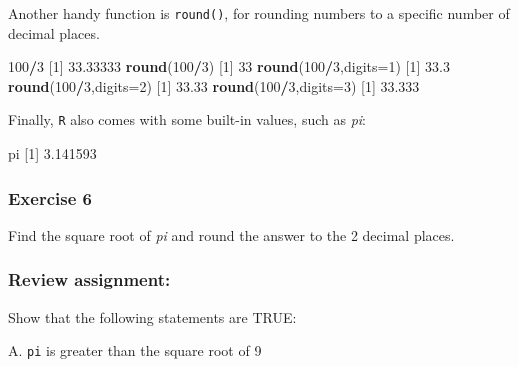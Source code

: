 \documentclass[
]{book}
\newenvironment{Shaded}{\begin{snugshade}}{\end{snugshade}}
\newcommand{\DataTypeTok}[1]{\textcolor[rgb]{0.13,0.29,0.53}{#1}}
\newcommand{\DecValTok}[1]{\textcolor[rgb]{0.00,0.00,0.81}{#1}}
\newcommand{\FloatTok}[1]{\textcolor[rgb]{0.00,0.00,0.81}{#1}}
\newcommand{\KeywordTok}[1]{\textcolor[rgb]{0.13,0.29,0.53}{\textbf{#1}}}
\newcommand{\NormalTok}[1]{#1}
\newcommand{\OperatorTok}[1]{\textcolor[rgb]{0.81,0.36,0.00}{\textbf{#1}}}
\begin{document}
Another handy function is \texttt{round()}, for rounding numbers to a specific number of decimal places.

\begin{Shaded}
\begin{Highlighting}[]
\DecValTok{100}\OperatorTok{/}\DecValTok{3}
\NormalTok{[}\DecValTok{1}\NormalTok{] }\FloatTok{33.33333}
\KeywordTok{round}\NormalTok{(}\DecValTok{100}\OperatorTok{/}\DecValTok{3}\NormalTok{)}
\NormalTok{[}\DecValTok{1}\NormalTok{] }\DecValTok{33}
\KeywordTok{round}\NormalTok{(}\DecValTok{100}\OperatorTok{/}\DecValTok{3}\NormalTok{,}\DataTypeTok{digits=}\DecValTok{1}\NormalTok{)}
\NormalTok{[}\DecValTok{1}\NormalTok{] }\FloatTok{33.3}
\KeywordTok{round}\NormalTok{(}\DecValTok{100}\OperatorTok{/}\DecValTok{3}\NormalTok{,}\DataTypeTok{digits=}\DecValTok{2}\NormalTok{)}
\NormalTok{[}\DecValTok{1}\NormalTok{] }\FloatTok{33.33}
\KeywordTok{round}\NormalTok{(}\DecValTok{100}\OperatorTok{/}\DecValTok{3}\NormalTok{,}\DataTypeTok{digits=}\DecValTok{3}\NormalTok{)}
\NormalTok{[}\DecValTok{1}\NormalTok{] }\FloatTok{33.333}
\end{Highlighting}
\end{Shaded}

Finally, \texttt{R} also comes with some built-in values, such as \emph{pi}:

\begin{Shaded}
\begin{Highlighting}[]
\NormalTok{pi}
\NormalTok{[}\DecValTok{1}\NormalTok{] }\FloatTok{3.141593}
\end{Highlighting}
\end{Shaded}

\hypertarget{exercise-6}{%
\subsubsection*{Exercise 6}\label{exercise-6}}

Find the square root of \emph{pi} and round the answer to the 2 decimal places.

\hypertarget{review-assignment}{%
\subsubsection*{Review assignment:}\label{review-assignment}}

Show that the following statements are TRUE:

A. \texttt{pi} is greater than the square root of 9
\end{document}
